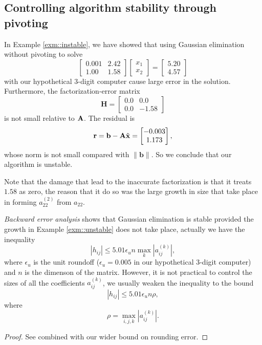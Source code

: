\subsection{Controlling algorithm stability through pivoting}
\begin{exm}
    \label{exm::unstable}
    In Example \ref{exm::instable}, we have showed that 
    using Gaussian elimination without pivoting to solve
    $$
        \begin{bmatrix}
            0.001&2.42\\1.00&1.58
        \end{bmatrix}
        \begin{bmatrix}
            x_1\\x_2
        \end{bmatrix}=
        \begin{bmatrix}
            5.20\\4.57
        \end{bmatrix}
    $$ 
    with our hypothetical 3-digit computer cause large error 
    in the solution. Furthermore, the factorization-error 
    matrix
    $$
        \mathbf{H}=
        \begin{bmatrix}
            0.0&0.0\\0.0&-1.58
        \end{bmatrix}
    $$ 
    is not small relative to ${\mathbf{A}}$. The residual is
    $$
        \mathbf{r}=\mathbf{b}-{\mathbf{A}}\tilde{{\mathbf{x}}}=
        \begin{bmatrix}
            -0.003\\1.173
        \end{bmatrix},
    $$ 
    whose norm is not small compared with $\|\mathbf{b}\|$. So 
    we conclude that our algorithm is unstable.

    Note that the damage that lead to the inaccurate 
    factorization is that it treats $1.58$ as zero, the reason 
    that it do so was the large growth in size that take place 
    in forming $a_{22}^{(2)}$ from $a_{22}$.  
\end{exm}

\begin{thm}
    \textit{Backward error analysis} shows that Gaussian 
    elimination is stable provided the growth in Example 
    \ref{exm::unstable} does not take place, actually we 
    have the inequality
    $$
        |h_{ij}|\leq 5.01\epsilon_u n\max_k|a_{ij}^{(k)}|,
    $$ 
    where $\epsilon_u$ is the unit roundoff ($\epsilon_u=0.005$ 
    in our hypothetical 3-digit computer) and $n$ is the 
    dimenson of the matrix. However, it is not practical to 
    control the sizes of all the coefficients $a_{ij}^{(k)}$, 
    we usually weaken the inequality to the bound
    \begin{equation}
        \label{eq::H-bound}
        |h_{ij}|\leq5.01\epsilon_u n\rho,
    \end{equation}
    where
    $$
        \rho=\max_{i,j,k}|a_{ij}^{(k)}|.
    $$ 
\end{thm}
\begin{proof}
    See \cite{Reid1971} combined with our wider bound on 
    rounding error.
\end{proof}

